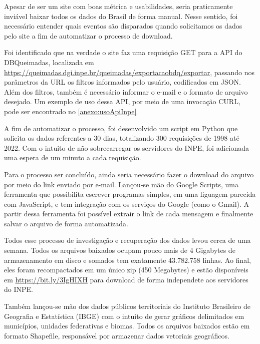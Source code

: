 \documentclass[cic,tc]{iiufrgs}
\begin{document}
Apesar de ser um site com boas métrica e usabilidades, seria praticamente inviável baixar todos os dados do Brasil de forma manual. Nesse sentido, foi necessário entender quais eventos são disparados quando solicitamos os dados pelo site a fim de automatizar o processo de download. \par

Foi identificado que na verdade o site faz uma requisição GET para a API do DBQueimadas, localizada em \url{https://queimadas.dgi.inpe.br/queimadas/exportacaobdq/exportar}, passando nos parâmetros da URL os filtros informados pelo usuário, codificados em JSON. Além dos filtros, também é necessário informar o e-mail e o formato de arquivo desejado. Um exemplo de uso dessa API, por meio de uma invocação CURL, pode ser encontrado no \ref{anexo:usoApiInpe} \par

A fim de automatizar o processo, foi desenvolvido um script em Python que solicita os dados referentes a 30 dias, totalizando 300 requisições de 1998 até 2022. Com o intuito de não sobrecarregar os servidores do INPE, foi adicionada uma espera de um minuto a cada requisição. \par

Para o processo ser concluído, ainda seria necessário fazer o download do arquivo por meio do link enviado por e-mail. Lançou-se mão do Google Scripts, uma ferramenta que possibilita escrever programas simples, em uma liguagem parecida com JavaScript, e tem integração com os serviços do Google (como o Gmail). A partir dessa ferramenta foi possível extrair o link de cada mensagem e finalmente salvar o arquivo de forma automatizada. \par

Todos esse processo de investigação e recuperação dos dados levou cerca de uma semana. Todos os arquivos baixados ocupam pouco mais de 4 Gigabytes de armazenamento em disco e somados tem exatamente 43.782.758 linhas. Ao final, eles foram recompactados em um único zip (450 Megabytes) e estão disponíveis em \url{https://bit.ly/3IgHIXH} para download de forma independete aos servidores do INPE. \par

Também lançou-se mão dos dados públicos territoriais do Instituto Brasileiro de Geografia e Estatística (IBGE) com o intuito de gerar gráficos delimitados em municípios, unidades federativas e biomas. Todos os arquivos baixados estão em formato Shapefile, responsável por armazenar dados vetoriais geográficos. \par
\end{document}
